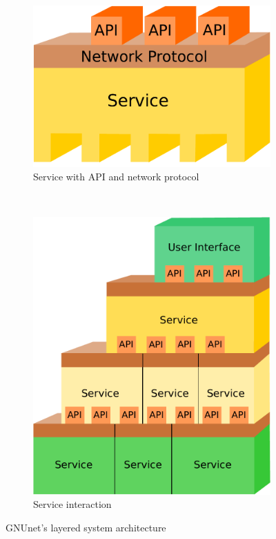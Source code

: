 \documentclass[10pt]{article}
\begin{document}
\begin{figure}[!h]
  \begin{center}
        \begin{subfigure}[b]{0.3\textwidth}
                \centering
                \includegraphics[width=\textwidth]{figs/Service.pdf}
                \caption{Service with API and network protocol}
                \label{fig:service}
        \end{subfigure}    
        ~~~~~~~~~~
        \begin{subfigure}[b]{0.3\textwidth}
                \centering
                \includegraphics[width=\textwidth]{figs/System.pdf}
                \caption{Service interaction}
                \label{fig:interaction}
        \end{subfigure}  
  \end{center}
  \caption{GNUnet's layered system architecture}
\end{figure}
\end{document}

